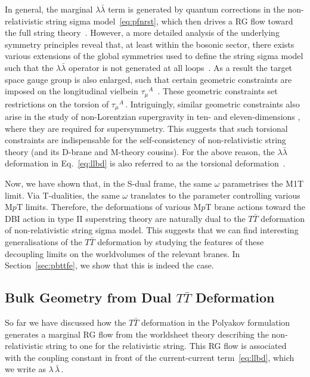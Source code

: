\documentclass[11pt]{article}
\begin{document}
In general, the marginal $\lambda\bar{\lambda}$ term is generated by quantum corrections in the non-relativistic string sigma model~\eqref{eq:pfnrst}, which then drives a RG flow toward the full string theory~\cite{Gomis:2019zyu, Gallegos:2019icg, Yan:2019xsf, Bergshoeff:2021bmc, Yan:2021lbe}.
However, a more detailed analysis of the underlying symmetry principles reveal that, at least within the bosonic sector, there exists various extensions of the global symmetries used to define the string sigma model such that the $\lambda\bar{\lambda}$ operator is not generated at all loops~\cite{Yan:2021lbe}. As a result the target space gauge group is also enlarged, such that certain geometric constraints are imposed on the longitudinal vielbein $\tau^{}_\mu{}^A$~\cite{Andringa:2012uz, Bergshoeff:2018yvt, Bergshoeff:2018vfn}. These geometric constraints set restrictions on the torsion of $\tau^{}_\mu{}^A$\,. Intriguingly, similar geometric constraints also arise in the study of non-Lorentzian supergravity in ten- and eleven-dimensions \cite{Bergshoeff:2021tfn, Bergshoeff:2024nin}, where they are required for supersymmetry.
This suggests that such torsional constraints are indispensable for the self-consistency of non-relativistic string theory (and its D-brane and M-theory cousins). For the above reason, the $\lambda\bar{\lambda}$ deformation in Eq.~\eqref{eq:llbd} is also referred to as the torsional deformation~\cite{Yan:2021lbe}. 

Now, we have shown that, in the S-dual frame, the same $\omega$ parametrises the M1T limit. Via T-dualities, the same $\omega$ translates to the parameter controlling various M$p$T limits. Therefore, the deformations of various M$p$T brane actions toward the DBI action in type II superstring theory are naturally dual to the $T\bar{T}$ deformation of non-relativistic string sigma model. 
This suggests that we can find interesting generalisations of the $T\bar{T}$ deformation by studying the features of these decoupling limits on the worldvolumes of the relevant branes.
In Section~\ref{sec:pbttfe}, we show that this is indeed the case.

\subsection{Bulk Geometry from Dual \texorpdfstring{$T\bar{T}$}{TTbar} Deformation} 
\label{sec:TTbarBulk} 

So far we have discussed how the $T\bar{T}$ deformation in the Polyakov formulation generates a marginal RG flow from the worldsheet theory describing the non-relativistic string to one for the relativistic string. This RG flow is associated with the coupling constant in front of the current-current term~\eqref{eq:llbd}, which we write as $\lambda \, \bar{\lambda}$\,. 
\end{document}

